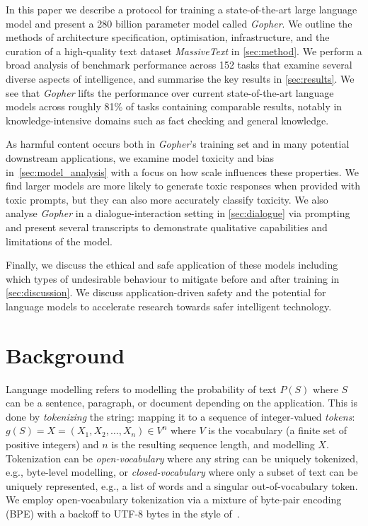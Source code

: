 In this paper we describe a protocol for training a state-of-the-art large language model and present a 280 billion parameter model called \textit{Gopher}. We outline the methods of architecture specification, optimisation, infrastructure, and the curation of a high-quality text dataset \textit{MassiveText} in \autoref{sec:method}. We perform a broad analysis of benchmark performance across 152 tasks that examine several diverse aspects of intelligence, and summarise the key results in \autoref{sec:results}. We see that \textit{Gopher} lifts the performance over current state-of-the-art language models across roughly 81\% of tasks containing comparable results, notably in knowledge-intensive domains such as fact checking and general knowledge. 

As harmful content occurs both in \textit{Gopher}'s training set and in many potential downstream applications, we examine model toxicity and bias in~\autoref{sec:model_analysis} with a focus on how scale influences these properties. We find larger models are more likely to generate toxic responses when provided with toxic prompts, but they can also more accurately classify toxicity. We also analyse \textit{Gopher} in a dialogue-interaction setting in \autoref{sec:dialogue} via prompting and present several transcripts to demonstrate qualitative capabilities and limitations of the model.

Finally, we discuss the ethical and safe application of these models including which types of undesirable behaviour to mitigate before and after training in \autoref{sec:discussion}. We discuss application-driven safety and the potential for language models to accelerate research towards safer intelligent technology.

\section{Background}
\label{background}
Language modelling refers to modelling the probability of text $P(S)$ where $S$ can be a sentence, paragraph, or document depending on the application. This is done by \textit{tokenizing} the string: mapping it to a sequence of integer-valued \textit{tokens}: $g(S) = X = (X_1, X_2, \ldots, X_n) \in V^n$ where $V$ is the vocabulary (a finite set of positive integers) and $n$ is the resulting sequence length, and modelling $X$. Tokenization can be \textit{open-vocabulary} where any string can be uniquely tokenized, e.g., byte-level modelling, or \textit{closed-vocabulary} where only a subset of text can be uniquely represented, e.g., a list of words and a singular out-of-vocabulary token. We employ open-vocabulary tokenization via a mixture of byte-pair encoding (BPE) with a backoff to UTF-8 bytes in the style of~\citet{radford2018improving}. 

